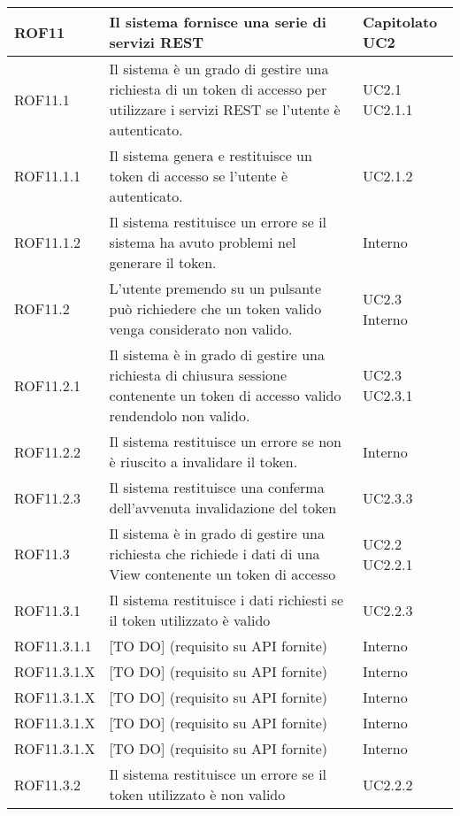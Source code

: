 \begin{center}
\begin{longtable}{| p{2.5cm} | p{8cm} | p{2cm} |}
		ROF11  &  Il sistema fornisce una serie di servizi REST  & Capitolato \newline UC2 \\
		\hline
		ROF11.1  &  Il sistema è un grado di gestire una richiesta di un token di accesso per utilizzare i servizi REST se l'utente è autenticato.  & UC2.1 \newline UC2.1.1 \\
		\hline
		ROF11.1.1  &  Il sistema genera e restituisce un token di accesso se l'utente è autenticato. & UC2.1.2 \\
		\hline
		ROF11.1.2  &  Il sistema restituisce un errore se il sistema ha avuto problemi nel generare il token. & Interno \\
		\hline
		ROF11.2  &  L'utente premendo su un pulsante può richiedere che un token valido venga considerato non valido.  & UC2.3 \newline Interno \\
		\hline
		ROF11.2.1  &  Il sistema è in grado di gestire una richiesta di chiusura sessione contenente un token di accesso valido rendendolo non valido. & UC2.3 \newline UC2.3.1 \\
		\hline
		ROF11.2.2  &  Il sistema restituisce un errore se non è riuscito a invalidare il token. & Interno \\
		\hline
		ROF11.2.3  &  Il sistema restituisce una conferma dell'avvenuta invalidazione del token & UC2.3.3 \\
		\hline
		ROF11.3  &  Il sistema è in grado di gestire una richiesta che richiede i dati di una View contenente un token di accesso  &  UC2.2 \newline UC2.2.1 \\
		\hline
		ROF11.3.1  &  Il sistema restituisce i dati richiesti se il token utilizzato è valido  &  UC2.2.3 \\
		\hline
		ROF11.3.1.1 & [TO DO] (requisito su API fornite) & Interno \\
		\hline
		ROF11.3.1.X & [TO DO] (requisito su API fornite) & Interno \\
		\hline
		ROF11.3.1.X & [TO DO] (requisito su API fornite) & Interno \\
		\hline
		ROF11.3.1.X & [TO DO] (requisito su API fornite) & Interno \\
		\hline
		ROF11.3.1.X & [TO DO] (requisito su API fornite) & Interno \\
		\hline

		ROF11.3.2  &  Il sistema restituisce un errore se il token utilizzato è non valido  &  UC2.2.2 \\
		\hline

	\end{longtable}
	\egroup
\end{center}


